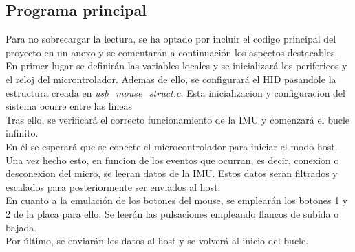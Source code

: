 \documentclass[a4paper,twoside]{article}
\begin{document}
\subsection{Programa principal}
Para no sobrecargar la lectura, se ha optado por incluir el codigo principal del proyecto en un anexo y se comentarán a continuación los aspectos destacables.\\
En primer lugar se definirán las variables locales y se inicializará los perifericos y el reloj del microntrolador. Ademas de ello, se configurará el HID pasandole la estructura creada en \textit{usb\_mouse\_struct.c}. Esta inicializacion y configuracion del sistema ocurre entre las lineas  \\
Tras ello, se verificará el correcto funcionamiento de la IMU y comenzará el bucle infinito.\\
En él se esperará que se conecte el microcontrolador para iniciar el modo host. Una vez hecho esto, en funcion de los eventos que ocurran, es decir, conexion o desconexion del micro, se leeran datos de la IMU. Estos datos seran filtrados y escalados para posteriormente ser enviados al host. \\
En cuanto a la emulación de los botones del mouse, se emplearán los botones 1 y 2 de la placa para ello. Se leerán las pulsaciones empleando flancos de subida o bajada. \\
Por último, se enviarán los datos al host y se volverá al inicio del bucle.

\newpage
\end{document}

